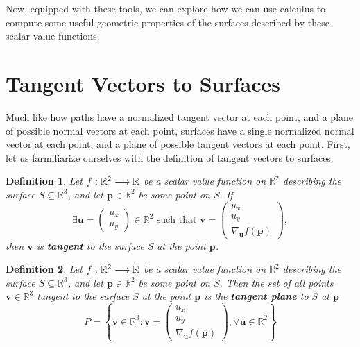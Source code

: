 \documentclass[12pt]{book}
\newcommand{\rbb}{\mathbb{R}}
\theoremstyle{definitionstyle}
\newtheorem{definition}{Definition}[section]
\numberwithin{equation}{section}
\begin{document}
Now, equipped with these tools, we can explore how we can use calculus to compute some useful geometric properties of the surfaces described by these scalar value functions.

\newpage

\section{Tangent Vectors to Surfaces}

Much like how paths have a normalized tangent vector at each point, and a plane of possible normal vectors at each point, surfaces have a single normalized normal vector at each point, and a plane of possible tangent vectors at each point. First, let us farmiliarize ourselves with the definition of tangent vectors to surfaces.

\vspace{0.5cm}

\begin{definition}
    Let $\func{f}{\rbb^2}{\rbb}$ be a scalar value function on $\rbb^2$ describing the surface $S \subseteq \rbb^3$, and let $\mathbf{p} \in \rbb^2$ be some point on $S$. If 
    \begin{equation}
	\exists \mathbf{u} = \begin{pmatrix} u_x \\ u_y \end{pmatrix} \in \rbb^2 \text{ such that } \mathbf{v} = \begin{pmatrix} u_x \\ u_y \\ \nabla_\mathbf{u} f(\mathbf{p}) \end{pmatrix},
    \end{equation}
    then $\mathbf{v}$ is \textbf{tangent} to the surface $S$ at the point $\mathbf{p}$.
\end{definition}

\vspace{0.5cm}

\begin{definition}
    Let $\func{f}{\rbb^2}{\rbb}$ be a scalar value function on $\rbb^2$ describing the surface $S \subseteq \rbb^3$, and let $\mathbf{p} \in \rbb^2$ be some point on $S$. Then the set of all points $\mathbf{v} \in \rbb^3$ tangent to the surface $S$ at the point $\mathbf{p}$ is the \textbf{tangent plane} to $S$ at $\mathbf{p}$
    \begin{equation}
	P = \left\{ \mathbf{v} \in \rbb^3 : \mathbf{v} = \begin{pmatrix} u_x \\ u_y \\ \nabla_\mathbf{u} f(\mathbf{p}) \end{pmatrix}, \forall \mathbf{u} \in \rbb^2 \right\}
    \end{equation}
\end{definition}
\end{document}
